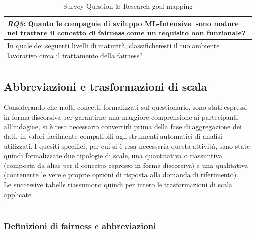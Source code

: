 \begin{longtable}{| p{} |}
        \\ \hline
        \rowcolor{Gray}
        \textbf{\textit{{RQ5}}}:  Quanto le compagnie di sviluppo ML-Intensive, sono mature nel trattare il concetto di fairness come un requisito non funzionale?\\
        
        \hline 
        In quale dei seguenti livelli di maturità, classificheresti il tuo ambiente lavorativo circa il trattamento della fairness?
        \\ \hline
        \caption{Survey Question \& Research goal mapping} %
    \label{tab:myfirstlongtable}
    \end{longtable}
    
    \subsection{Abbreviazioni e trasformazioni di scala}
    
    Considerando che molti concetti formalizzati sul questionario, sono stati espressi in forma discorsiva per garantirne una maggiore comprensione ai partecipanti all'indagine, si è reso necessario convertirli prima della fase di aggregazione dei dati, in valori facilmente compatibili agli strumenti automatici di analisi utilizzati. I quesiti specifici, per cui si è resa necessaria questa attività, sono state quindi formalizzate due tipologie di scale, una quantitativa o riassuntiva (composta da alias per il concetto espresso in forma discorsiva) e una qualitativa (contenente le vere e proprie opzioni di risposta alla domanda di riferimento).\\
    
    Le successive tabelle riassumono quindi per intero le trasformazioni di scala applicate.\\\\
    
    
    \subsubsection{Definizioni di fairness e abbreviazioni}
    
    \begin{center}
		\hspace*{-5mm}%
	\end{center}
	
